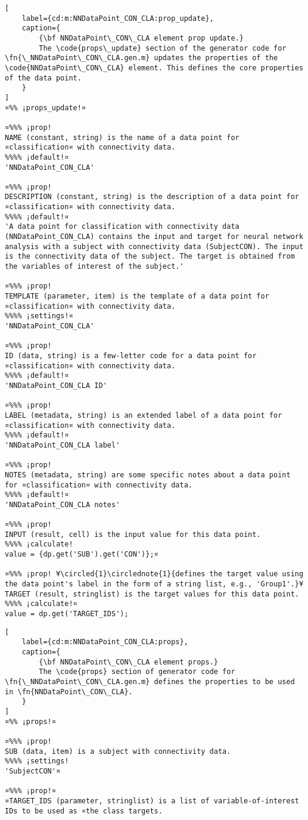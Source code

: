 \documentclass{tufte-handout}
\begin{document}
\begin{lstlisting}[
	label={cd:m:NNDataPoint_CON_CLA:prop_update},
	caption={
		{\bf NNDataPoint\_CON\_CLA element prop update.}
		The \code{props\_update} section of the generator code for \fn{\_NNDataPoint\_CON\_CLA.gen.m} updates the properties of the \code{NNDataPoint\_CON\_CLA} element. This defines the core properties of the data point.
	}
]
¤%% ¡props_update!¤

¤%%% ¡prop!
NAME (constant, string) is the name of a data point for ¤classification¤ with connectivity data.
%%%% ¡default!¤
'NNDataPoint_CON_CLA'

¤%%% ¡prop!
DESCRIPTION (constant, string) is the description of a data point for ¤classification¤ with connectivity data.
%%%% ¡default!¤
'A data point for classification with connectivity data (NNDataPoint_CON_CLA) contains the input and target for neural network analysis with a subject with connectivity data (SubjectCON). The input is the connectivity data of the subject. The target is obtained from the variables of interest of the subject.'

¤%%% ¡prop!
TEMPLATE (parameter, item) is the template of a data point for ¤classification¤ with connectivity data.
%%%% ¡settings!¤
'NNDataPoint_CON_CLA'

¤%%% ¡prop!
ID (data, string) is a few-letter code for a data point for ¤classification¤ with connectivity data.
%%%% ¡default!¤
'NNDataPoint_CON_CLA ID'

¤%%% ¡prop!
LABEL (metadata, string) is an extended label of a data point for ¤classification¤ with connectivity data.
%%%% ¡default!¤
'NNDataPoint_CON_CLA label'

¤%%% ¡prop!
NOTES (metadata, string) are some specific notes about a data point for ¤classification¤ with connectivity data.
%%%% ¡default!¤
'NNDataPoint_CON_CLA notes'

¤%%% ¡prop!
INPUT (result, cell) is the input value for this data point.
%%%% ¡calculate!
value = {dp.get('SUB').get('CON')};¤
    
¤%%% ¡prop! ¥\circled{1}\circlednote{1}{defines the target value using the data point's label in the form of a string list, e.g., 'Group1'.}¥
TARGET (result, stringlist) is the target values for this data point.
%%%% ¡calculate!¤
value = dp.get('TARGET_IDS'); 

\end{lstlisting}

\begin{lstlisting}[
	label={cd:m:NNDataPoint_CON_CLA:props},
	caption={
		{\bf NNDataPoint\_CON\_CLA element props.}
		The \code{props} section of generator code for \fn{\_NNDataPoint\_CON\_CLA.gen.m} defines the properties to be used in \fn{NNDataPoint\_CON\_CLA}.
	}
]
¤%% ¡props!¤

¤%%% ¡prop!
SUB (data, item) is a subject with connectivity data.
%%%% ¡settings!
'SubjectCON'¤

¤%%% ¡prop!¤ 
¤TARGET_IDS (parameter, stringlist) is a list of variable-of-interest IDs to be used as ¤the class targets.

\end{lstlisting}
\end{document}
